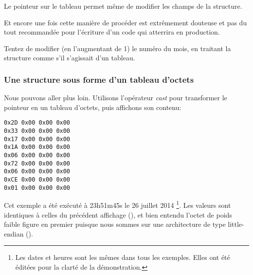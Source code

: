 Le pointeur sur le tableau permet même de modifier les champs de la structure.

Et encore une fois cette manière de procéder est extrêmement douteuse et pas du tout recommandée 
pour l'écriture d'un code qui atterrira en production.

\mysubparagraph{\Exercise}

Tentez de modifier (en l'augmentant de 1) le numéro du mois, en traitant la structure comme s'il 
s'agissait d'un tableau.

\subsubsection{Une structure sous forme d'un tableau d'octets}

Nous pouvons aller plus loin.
Utilisons l'opérateur \emph{cast} pour transformer le pointeur en un tableau d'octets, puis affichons 
son contenu:



\begin{lstlisting}
0x2D 0x00 0x00 0x00 
0x33 0x00 0x00 0x00 
0x17 0x00 0x00 0x00 
0x1A 0x00 0x00 0x00 
0x06 0x00 0x00 0x00 
0x72 0x00 0x00 0x00 
0x06 0x00 0x00 0x00 
0xCE 0x00 0x00 0x00 
0x01 0x00 0x00 0x00 
\end{lstlisting}

Cet exemple a été exécuté à 23h51m45s le 26 juillet 2014
\footnote{Les dates et heures sont les mêmes dans tous les exemples. Elles ont été éditées 
pour la clarté de la démonstration.}.
Les valeurs sont identiques à celles du précédent affichage (), et bien 
entendu l'octet de poids faible figure en premier puisque nous sommes sur une architecture de type 
little-endian ().


